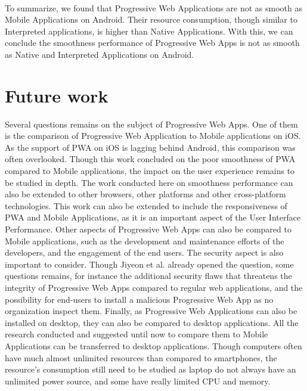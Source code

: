 \documentclass{kththesis}
\begin{document}
\paragraph{}
To summarize, we found that Progressive Web Applications are not as smooth as Mobile Applications on Android. Their resource consumption, though similar to Interpreted applications, is higher than Native Applications. With this, we can conclude the smoothness performance of Progressive Web Apps is not as smooth as Native and Interpreted Applications on Android. 
\fi

\section{Future work}
Several questions remains on the subject of Progressive Web Apps. One of them is the comparison of Progressive Web Application to Mobile applications on iOS. As the support of PWA on iOS is lagging behind Android, this comparison was often overlooked. \newline
Though this work concluded on the poor smoothness of PWA compared to Mobile applications, the impact  on the user experience remains to be studied in depth. 
The work conducted here on smoothness performance can also be extended to other browsers, other platforms and other cross-platform technologies. This work can also be extended to include the responsiveness of PWA and Mobile Applications, as it is an important aspect of the User Interface Performance. \newline
Other aspects of Progressive Web Apps can also be compared to Mobile applications, such as the development and maintenance efforts of the developers, and the engagement of the end users. \newline
The security aspect is also important to consider. Though Jiyeon et al. \cite{Pride_Prejudice} already opened the question, some questions remains, for instance the additional security flaws that threatens the integrity of Progressive Web Apps compared to regular web applications, and the possibility for end-users to install a malicious Progressive Web App as no organization inspect them.
Finally, as Progressive Web Applications can also be installed on desktop, they can also be compared to desktop applications. All the research conducted and suggested until now to compare them to Mobile Applications can be transferred to desktop applications. Though computers often have much almost unlimited resources than compared to smartphones, the resource's consumption still need to be studied as laptop do not always have an unlimited power source, and some have really limited CPU and memory. 
\end{document}
